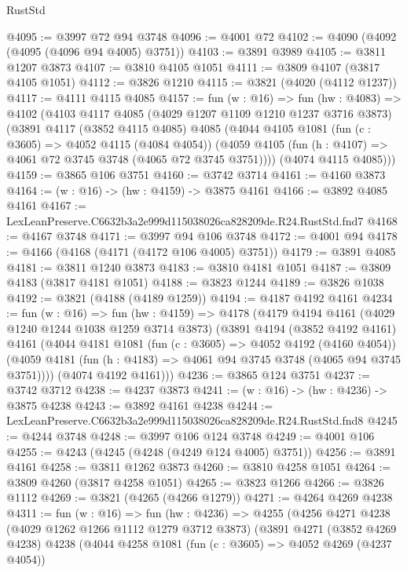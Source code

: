 \begin{lexlean}{RustStd}
\begin{coremodule}
@4095 := @3997 @72 @94 @3748
@4096 := @4001 @72
@4102 := @4090 (@4092 (@4095 (@4096 @94 @4005) @3751))
@4103 := @3891 @3989
@4105 := @3811 @1207 @3873
@4107 := @3810 @4105 @1051
@4111 := @3809 @4107 (@3817 @4105 @1051)
@4112 := @3826 @1210
@4115 := @3821 (@4020 (@4112 @1237))
@4117 := @4111 @4115 @4085
@4157 := fun (w : @16) =>
  fun (hw : @4083) =>
  @4102
    (@4103
      @4117
      @4085
      (@4029 @1207 @1109 @1210 @1237 @3716 @3873)
      (@3891
        @4117
        (@3852 @4115 @4085)
        @4085
        (@4044
          @4105
          @1081
          (fun (c : @3605) => @4052 @4115 (@4084 @4054))
          (@4059 @4105 (fun (h : @4107) => @4061 @72 @3745 @3748 (@4065 @72 @3745 @3751))))
        (@4074 @4115 @4085)))
@4159 := @3865 @106 @3751
@4160 := @3742 @3714
@4161 := @4160 @3873
@4164 := (w : @16) -> (hw : @4159) -> @3875 @4161
@4166 := @3892 @4085 @4161
@4167 := LexLeanPreserve.C6632b3a2e999d115038026ca828209de.R24.RustStd.fnd7
@4168 := @4167 @3748
@4171 := @3997 @94 @106 @3748
@4172 := @4001 @94
@4178 := @4166 (@4168 (@4171 (@4172 @106 @4005) @3751))
@4179 := @3891 @4085
@4181 := @3811 @1240 @3873
@4183 := @3810 @4181 @1051
@4187 := @3809 @4183 (@3817 @4181 @1051)
@4188 := @3823 @1244
@4189 := @3826 @1038
@4192 := @3821 (@4188 (@4189 @1259))
@4194 := @4187 @4192 @4161
@4234 := fun (w : @16) =>
  fun (hw : @4159) =>
  @4178
    (@4179
      @4194
      @4161
      (@4029 @1240 @1244 @1038 @1259 @3714 @3873)
      (@3891
        @4194
        (@3852 @4192 @4161)
        @4161
        (@4044
          @4181
          @1081
          (fun (c : @3605) => @4052 @4192 (@4160 @4054))
          (@4059 @4181 (fun (h : @4183) => @4061 @94 @3745 @3748 (@4065 @94 @3745 @3751))))
        (@4074 @4192 @4161)))
@4236 := @3865 @124 @3751
@4237 := @3742 @3712
@4238 := @4237 @3873
@4241 := (w : @16) -> (hw : @4236) -> @3875 @4238
@4243 := @3892 @4161 @4238
@4244 := LexLeanPreserve.C6632b3a2e999d115038026ca828209de.R24.RustStd.fnd8
@4245 := @4244 @3748
@4248 := @3997 @106 @124 @3748
@4249 := @4001 @106
@4255 := @4243 (@4245 (@4248 (@4249 @124 @4005) @3751))
@4256 := @3891 @4161
@4258 := @3811 @1262 @3873
@4260 := @3810 @4258 @1051
@4264 := @3809 @4260 (@3817 @4258 @1051)
@4265 := @3823 @1266
@4266 := @3826 @1112
@4269 := @3821 (@4265 (@4266 @1279))
@4271 := @4264 @4269 @4238
@4311 := fun (w : @16) =>
  fun (hw : @4236) =>
  @4255
    (@4256
      @4271
      @4238
      (@4029 @1262 @1266 @1112 @1279 @3712 @3873)
      (@3891
        @4271
        (@3852 @4269 @4238)
        @4238
        (@4044
          @4258
          @1081
          (fun (c : @3605) => @4052 @4269 (@4237 @4054))

\end{coremodule}
\end{lexlean}
